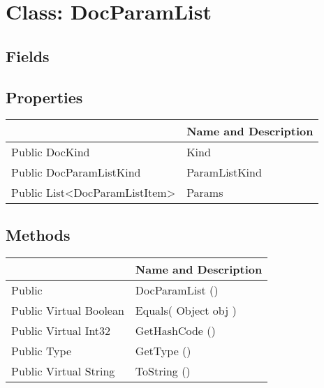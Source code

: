 \documentclass[11pt, oneside, a4paper]{book}
\begin{document}
\hypertarget{SoftwareEngineeringTools.{}Documentation.{}DocParamList}{}
\section{Class: DocParamList}

\subsection{Fields}

\subsection{Properties}
\begin{center}
\begin{tabular}{| p{3cm} | p{12cm} | }
\hline
\textbf{ } & \textbf{ Name and Description}\\
\hline
 Public  DocKind &  Kind\hypertarget{SoftwareEngineeringTools.{}Documentation.{}DocParamList.{}Kind}{}\\
\hline
 Public  DocParamListKind &  ParamListKind\hypertarget{SoftwareEngineeringTools.{}Documentation.{}DocParamList.{}ParamListKind}{}\\
\hline
 Public  List<DocParamListItem> &  Params\hypertarget{SoftwareEngineeringTools.{}Documentation.{}DocParamList.{}Params}{}\\
\hline
\end{tabular}
\end{center}

\subsection{Methods}
\begin{center}
\begin{tabular}{| p{3cm} | p{12cm} | }
\hline
\textbf{ } & \textbf{ Name and Description}\\
\hline
 Public  &  DocParamList ()\hypertarget{SoftwareEngineeringTools.{}Documentation.{}DocParamList.{}DocParamList}{}\\
\hline
 Public  Virtual  Boolean &  Equals(\hypertarget{SoftwareEngineeringTools.{}Documentation.{}DocParamList.{}Equals\_Object}{} Object  obj  )\\
\hline
 Public  Virtual  Int32 &  GetHashCode ()\hypertarget{SoftwareEngineeringTools.{}Documentation.{}DocParamList.{}GetHashCode}{}\\
\hline
 Public  Type &  GetType ()\hypertarget{SoftwareEngineeringTools.{}Documentation.{}DocParamList.{}GetType}{}\\
\hline
 Public  Virtual  String &  ToString ()\hypertarget{SoftwareEngineeringTools.{}Documentation.{}DocParamList.{}ToString}{}\\
\hline
\end{tabular}
\end{center}
 
\end{document}
